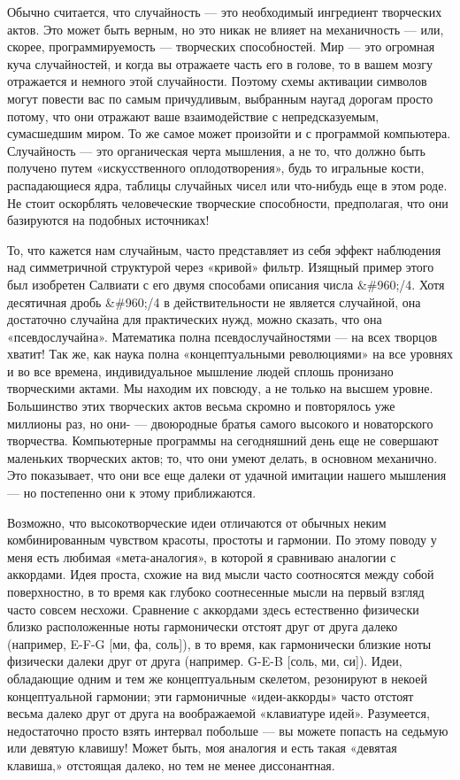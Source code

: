 \documentclass[../main.tex]{subfiles}
\begin{document}
Обычно считается, что случайность --- это необходимый ингредиент творческих актов. Это может быть верным, но это никак не влияет на механичность --- или, скорее, программируемость --- творческих способностей. Мир --- это огромная куча случайностей, и когда вы отражаете часть его в голове, то в вашем мозгу отражается и немного этой случайности. Поэтому схемы активации символов могут повести вас по самым причудливым, выбранным наугад дорогам просто потому, что они отражают ваше взаимодействие с непредсказуемым, сумасшедшим миром. То же самое может произойти и с программой компьютера. Случайность --- это органическая черта мышления, а не то, что должно быть получено путем «искусственного оплодотворения», будь то игральные кости, распадающиеся ядра, таблицы случайных чисел или что-нибудь еще в этом роде. Не стоит оскорблять человеческие творческие способности, предполагая, что они базируются на подобных источниках!

То, что кажется нам случайным, часто представляет из себя эффект наблюдения над симметричной структурой через «кривой» фильтр. Изящный пример этого был изобретен Салвиати с его двумя способами описания числа \&\#960;/4. Хотя десятичная дробь \&\#960;/4 в действительности не является случайной, она достаточно случайна для практических нужд, можно сказать, что она «псевдослучайна». Математика полна псевдослучайностями --- на всех творцов хватит! Так же, как наука полна «концептуальными революциями» на все уровнях и во все времена, индивидуальное мышление людей сплошь пронизано творческими актами. Мы находим их повсюду, а не только на высшем уровне. Большинство этих творческих актов весьма скромно и повторялось уже миллионы раз, но они- --- двоюродные братья самого высокого и новаторского творчества. Компьютерные программы на сегодняшний день еще не совершают маленьких творческих актов; то, что они умеют делать, в основном механично. Это показывает, что они все еще далеки от удачной имитации нашего мышления --- но постепенно они к этому приближаются.

Возможно, что высокотворческие идеи отличаются от обычных неким комбинированным чувством красоты, простоты и гармонии. По этому поводу у меня есть любимая «мета-аналогия», в которой я сравниваю аналогии с аккордами. Идея проста, схожие на вид мысли часто соотносятся между собой поверхностно, в то время как глубоко соотнесенные мысли на первый взгляд часто совсем несхожи. Сравнение с аккордами здесь естественно физически близко расположенные ноты гармонически отстоят друг от друга далеко (например, E-F-G {[}ми, фа, соль{]}), в то время, как гармонически близкие ноты физически далеки друг от друга (например. G-E-B {[}соль, ми, си{]}). Идеи, обладающие одним и тем же концептуальным скелетом, резонируют в некоей концептуальной гармонии; эти гармоничные «идеи-аккорды» часто отстоят весьма далеко друг от друга на воображаемой «клавиатуре идей». Разумеется, недостаточно просто взять интервал побольше --- вы можете попасть на седьмую или девятую клавишу! Может быть, моя аналогия и есть такая «девятая клавиша,» отстоящая далеко, но тем не менее диссонантная.
\end{document}
